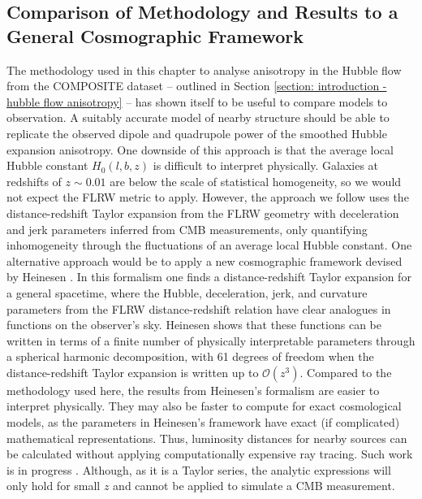 \documentclass[a4paper,12pt]{report}
\begin{document}
\subsection{Comparison of Methodology and Results to a General Cosmographic Framework}\label{section: BNW model discussion - Asta's framework}
The methodology used in this chapter to analyse anisotropy in the Hubble flow from the COMPOSITE dataset -- outlined in Section \ref{section: introduction - hubble flow anisotropy} -- has shown itself to be useful to compare models to observation. A suitably accurate model of nearby structure should be able to replicate the observed dipole and quadrupole power of the smoothed Hubble expansion anisotropy. One downside of this approach is that the average local Hubble constant $H_0(l,b,z)$ is difficult to interpret physically. Galaxies at redshifts of $z \sim 0.01$ are below the scale of statistical homogeneity, so we would not expect the FLRW metric to apply. However, the approach we follow uses the distance-redshift Taylor expansion from the FLRW geometry with deceleration and jerk parameters inferred from CMB measurements, only quantifying inhomogeneity through the fluctuations of an average local Hubble constant. One alternative approach would be to apply a new cosmographic framework devised by Heinesen \cite{RN235}. In this formalism one finds a distance-redshift Taylor expansion for a general spacetime, where the Hubble, deceleration, jerk, and curvature parameters from the FLRW distance-redshift relation have clear analogues in functions on the observer's sky. Heinesen shows that these functions can be written in terms of a finite number of physically interpretable parameters through a spherical harmonic decomposition, with 61 degrees of freedom when the distance-redshift Taylor expansion is written up to $\mathcal{O}(z^3)$. Compared to the methodology used here, the results from Heinesen's formalism are easier to interpret physically. They may also be faster to compute for exact cosmological models, as the parameters in Heinesen's framework have exact (if complicated) mathematical representations. Thus, luminosity distances for nearby sources can be calculated without applying computationally expensive ray tracing. Such work is in progress \cite{RN261}. Although, as it is a Taylor series, the analytic expressions will only hold for small $z$ and cannot be applied to simulate a CMB measurement.
\end{document}
